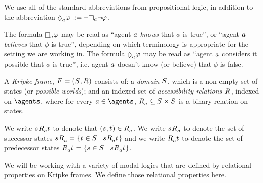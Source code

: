 We use all of the standard abbreviations from propositional logic, in addition to the abbreviation $\possibleA \phi ::= \lnot \necessaryA \lnot \phi$.

The formula $\necessaryA \phi$ may be read as ``agent $a$ {\em knows} that $\phi$ is true'', or ``agent $a$ {\em believes} that $\phi$ is true'', depending on which terminology is appropriate for the setting we are working in.
The formula $\possibleA \phi$ may be read as ``agent $a$ considers it possible that $\phi$ is true'', i.e. agent $a$ doesn't know (or believe) that $\phi$ is false.

\begin{definition}
A {\em Kripke frame}, $\kFrameAndTuple$ consists of:
a {\em domain} $\kStates$, which is a non-empty set of states (or {\em possible worlds}); and
an indexed set of {\em accessibility relations} $\kAccessibilityRel$, indexed on $\agents$, where for every $\agentA \in \agents$, $\kAccessibilityA \subseteq \kStates \times \kStates$ is a binary relation on states.
\end{definition}

We write $\kStateS \kAccessibilityA \kStateT$ to denote that $(\kStateS, \kStateT) \in \kAccessibilityA$.
We write $\kSuccessorsA{\kStateS}$ to denote the set of successor states $\kSuccessorsA{\kStateS} = \{\kStateT \in \kStates \mid \kStateS \kAccessibilityA \kStateT\}$ and
we write $\kPredecessorsA{\kStateT}$ to denote the set of predecessor states $\kPredecessorsA{\kStateT} = \{\kStateS \in \kStates \mid \kStateS \kAccessibilityA \kStateT\}$.

We will be working with a variety of modal logics that are defined by relational properties on Kripke frames.
We define those relational properties here.

